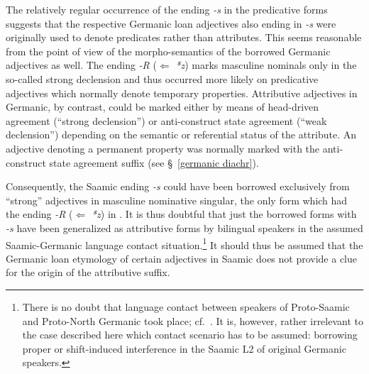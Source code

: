 {The relatively regular occurrence of the ending \textit{-s} in the predicative forms suggests that the respective Germanic loan adjectives also ending in \textit{-s} were originally used to denote predicates rather than attributes. This seems reasonable from the point of view of the morpho-semantics of the borrowed Germanic adjectives as well. The ending \textit{-R} ($\Leftarrow$ \textit{*z}) marks masculine nominals only in the so-called strong declension and thus occurred more likely on predicative adjectives which normally denote temporary properties. Attributive adjectives in Germanic, by contrast, could be marked either by means of head\hyp{}driven agreement (“strong declension”) or anti-construct state agreement (“weak declension”) depending on the semantic or referential status of the attribute. An adjective denoting a permanent property was normally marked with the anti-construct state agreement suffix (see \S~\ref{germanic diachr}).

Consequently, the Saamic ending \textit{-s} could have been borrowed exclusively from “strong” adjectives in masculine nominative singular, the only form which had the ending \textit{-R} ($\Leftarrow$ \textit{*z}) in . It is thus doubtful that just the borrowed forms with \textit{-s} have been generalized as attributive forms by bilingual speakers in the assumed Saamic-Germanic language contact situation.\footnote{There is no doubt that language contact between speakers of Proto\hyp{}Saamic and Proto\hyp{}North Germanic took place; cf.~\citealt{kusmenko2008}. It is, however, rather irrelevant to the case described here which contact scenario has to be assumed: borrowing proper or shift-induced interference in the Saamic L2 of original Germanic speakers.} It should thus be assumed that the Germanic loan etymology of certain adjectives in Saamic does not provide a clue for the origin of the attributive suffix. 

}
